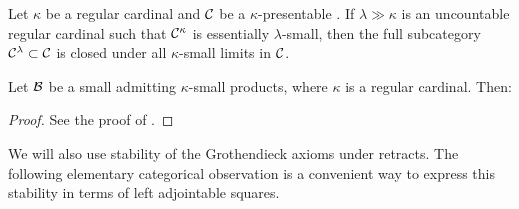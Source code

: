 \documentclass[a4paper,10pt, oneside]{amsart}
\begin{document}
	\begin{lem}\label{compprod}
		Let $\kappa$ be a regular cardinal and $\mathcal{C}$ be a $\kappa$-presentable \infcat. If $\lambda\gg \kappa$ is an uncountable regular cardinal such that $\mathcal{C}^\kappa$
		is essentially $\lambda$-small, then the full subcategory $\mathcal{C}^\lambda\subset \mathcal{C}$ is closed under all $\kappa$-small limits in $\mathcal{C}$.
	\end{lem}
	\begin{lem}\label{ab6prod}
		Let $\mathcal{B}$ be a small \infcat admitting $\kappa$-small products, where $\kappa$ is a regular cardinal. Then:
	\end{lem}
	\begin{proof}
		See the proof of \cite[Proposition 1.52]{efimov2024k}.
	\end{proof}
	We will also use stability of the Grothendieck axioms under retracts. The following elementary categorical observation is a convenient way to express this stability in terms of left adjointable squares.
	
\end{document}
